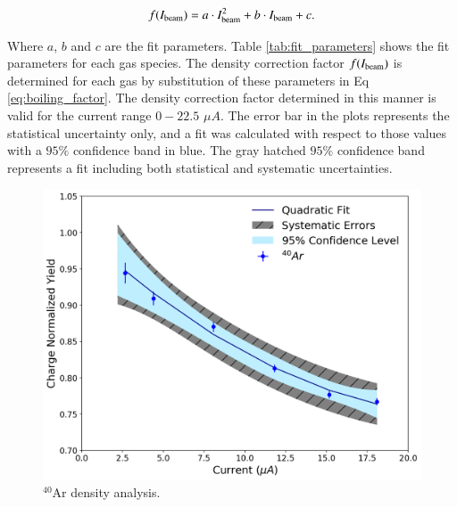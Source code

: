 \documentclass[review,numbers,sort&compress]{elsarticle}
\begin{document}
\begin{equation}
f(I_{\rm{beam}}) = a\cdot I_{\rm{beam}}^{2} + b \cdot I_{\rm{beam}} + c.
\label{eq:boiling_factor}
\end{equation}

\noindent Where $a$, $b$ and $c$ are the fit parameters. Table \ref{tab:fit_parameters} shows the fit parameters for each gas species. The density correction factor $f(I_{\rm{beam}})$ is determined for each gas by substitution of these parameters in Eq \ref{eq:boiling_factor}. The density correction factor determined in this manner is valid for the current range $0-22.5$ $\mu A$. The error bar in the plots represents the statistical uncertainty only, and a fit was calculated with respect to those values with a $95\%$ confidence band in blue. The gray hatched $95\%$ confidence band represents a fit including both statistical and systematic uncertainties.

\begin{figure}[!h]
	\centering
	\includegraphics[width=\linewidth]{images/argon_data.pdf}
	\caption{$^{40}$Ar density analysis.}
	\label{fig:argon_data}
\end{figure}
\end{document}
